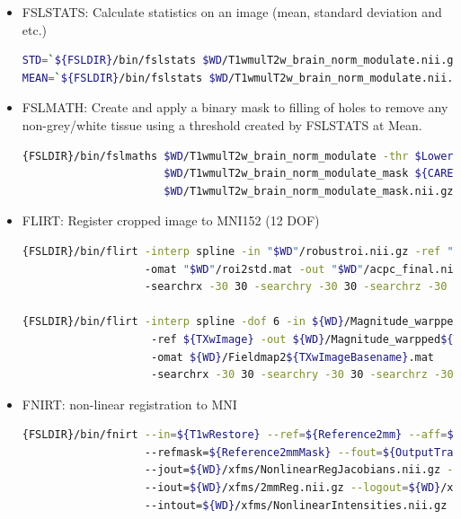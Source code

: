 \documentclass{article}
\begin{document}
\begin{itemize}
\item FSLSTATS: Calculate statistics on an image (mean, standard deviation and etc.)
    \begin{lstlisting}[language=bash, basicstyle=\tiny]
STD=`${FSLDIR}/bin/fslstats $WD/T1wmulT2w_brain_norm_modulate.nii.gz -S` 
MEAN=`${FSLDIR}/bin/fslstats $WD/T1wmulT2w_brain_norm_modulate.nii.gz -M` 
    \end{lstlisting}
\item FSLMATH: Create and apply a binary mask to filling of holes to remove  any non-grey/white tissue
using a threshold created by FSLSTATS at Mean.
    \begin{lstlisting}[language=bash, basicstyle=\tiny]
{FSLDIR}/bin/fslmaths $WD/T1wmulT2w_brain_norm_modulate -thr $Lower -bin -ero -mul 255 
                      $WD/T1wmulT2w_brain_norm_modulate_mask ${CARET7DIR}/wb_command -volume-remove-islands 
                      $WD/T1wmulT2w_brain_norm_modulate_mask.nii.gz $WD/T1wmulT2w_brain_norm_modulate_mask.nii.gz
    \end{lstlisting}

\item FLIRT: Register cropped image to MNI152 (12 DOF)
    \begin{lstlisting}[language=bash, basicstyle=\tiny]
{FSLDIR}/bin/flirt -interp spline -in "$WD"/robustroi.nii.gz -ref "$Reference"
                   -omat "$WD"/roi2std.mat -out "$WD"/acpc_final.nii.gz
                   -searchrx -30 30 -searchry -30 30 -searchrz -30 30

{FSLDIR}/bin/flirt -interp spline -dof 6 -in ${WD}/Magnitude_warpped${TXw}
                    -ref ${TXwImage} -out ${WD}/Magnitude_warpped${TXw}2${TXwImageBasename}
                    -omat ${WD}/Fieldmap2${TXwImageBasename}.mat
                    -searchrx -30 30 -searchry -30 30 -searchrz -30 30
    \end{lstlisting}

\item FNIRT: non-linear registration to MNI
    \begin{lstlisting}[language=bash, basicstyle=\tiny]
{FSLDIR}/bin/fnirt --in=${T1wRestore} --ref=${Reference2mm} --aff=${WD}/xfms/acpc2MNILinear.mat
                   --refmask=${Reference2mmMask} --fout=${OutputTransform}
                   --jout=${WD}/xfms/NonlinearRegJacobians.nii.gz --refout=${WD}/xfms/IntensityModulatedT1.nii.gz
                   --iout=${WD}/xfms/2mmReg.nii.gz --logout=${WD}/xfms/NonlinearReg.txt
                   --intout=${WD}/xfms/NonlinearIntensities.nii.gz --cout=${WD}/xfms/NonlinearReg.nii.gz --config=${FNIRTConfig}


\end{lstlisting}
\end{itemize}
\end{document}
